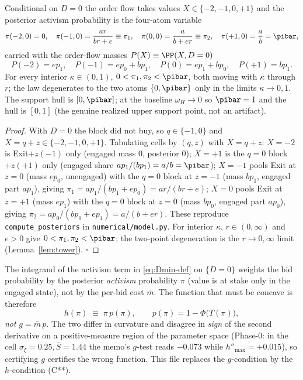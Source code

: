 \begin{lemma}
\label{lem:four-point}
Conditional on $D=0$ the order flow takes values $X\in\{-2,-1,0,+1\}$ and the
posterior activism probability is the four-atom variable
\begin{equation}
  \pi(-2,0)=0,\quad
  \pi(-1,0)=\frac{a r}{b r+e}\equiv\pi_1,\quad
  \pi(0,0)=\frac{a}{b+e r}\equiv\pi_2,\quad
  \pi(+1,0)=\frac{a}{b}=\pibar,
  \label{eq:atoms}
\end{equation}
carried with the order-flow masses $P(X)\equiv\PP(X,D=0)$
\begin{equation}
  P(-2)=e p_1,\quad P(-1)=e p_0+b p_1,\quad
  P(0)=e p_1+b p_0,\quad P(+1)=b p_1.
  \label{eq:masses}
\end{equation}
For every interior $\kappa\in(0,1)$, $0<\pi_1,\pi_2<\pibar$, both moving with
$\kappa$ through $r$; the law degenerates to the two atoms $\{0,\pibar\}$ only
in the limits $\kappa\to0,1$. The support hull is $[0,\pibar]$; at the baseline
$\omega_H\to0$ so $\pibar=1$ and the hull is $[0,1]$ (the genuine realized
upper support point, not an artifact).
\end{lemma}

\begin{proof}
With $D=0$ the block did not buy, so $q\in\{-1,0\}$ and
$X=q+z\in\{-2,-1,0,+1\}$. Tabulating cells by $(q,z)$ with $X=q+z$: $X=-2$ is
Exit$+z(-1)$ only (engaged mass $0$, posterior $0$); $X=+1$ is the $q=0$ block
$+z(+1)$ only (engaged share $a p_1/(b p_1)=a/b=\pibar$); $X=-1$ pools Exit at
$z=0$ (mass $e p_0$, unengaged) with the $q=0$ block at $z=-1$ (mass $b p_1$,
engaged part $a p_1$), giving $\pi_1=a p_1/(b p_1+e p_0)=ar/(br+e)$; $X=0$
pools Exit at $z=+1$ (mass $e p_1$) with the $q=0$ block at $z=0$ (mass
$b p_0$, engaged part $a p_0$), giving $\pi_2=a p_0/(b p_0+e p_1)=a/(b+er)$.
These reproduce \texttt{compute\_posteriors} in \texttt{numerical/model.py}.
For interior $\kappa$, $r\in(0,\infty)$ and $e>0$ give $0<\pi_1,\pi_2<\pibar$;
the two-point degeneration is the $r\to0,\infty$ limit
(Lemma~\ref{lem:tower}). \hfill$\square$
\end{proof}

\begin{remark}[Why $h=\pi p$, not the memo's $g=\bar m\,p$]
\label{rem:why-h}
The integrand of the activism term in \eqref{eq:Dmin-def} on $\{D=0\}$ weights
the bid probability by the posterior \emph{activism} probability $\pi$ (value
is at stake only in the engaged state), not by the per-bid cost $\bar m$. The
function that must be concave is therefore
\begin{equation}
  h(\pi)\;\equiv\;\pi\,p(\pi),\qquad p(\pi)=1-\Phi\!\big(T(\pi)\big),
  \label{eq:h-def}
\end{equation}
\emph{not} $g=\bar m\,p$. The two differ in curvature and disagree in
\emph{sign} of the second derivative on a positive-measure region of the
parameter space (Phase-0: in the cell $\sigma_\xi=0.25,\bar S=1.44$ the memo's
$g$-test reads $-0.073$ while $h''_{\max}=+0.015$), so certifying $g$ certifies
the wrong function. This file replaces the $g$-condition by the $h$-condition
(C**).
\end{remark}

